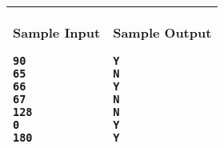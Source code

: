 \begin{table}[!h]
\centering
\begin{tabular}{|l|l|}
\hline
\begin{minipage}[t]{3in}
\textbf{Sample Input}
\begin{verbatim}
90
65
66
67
128
0
180
\end{verbatim}
\vspace{1mm}
\end{minipage}
&

\begin{minipage}[t]{3in}
\textbf{Sample Output}
\begin{verbatim}
Y
N
Y
N
N
Y
Y
\end{verbatim}
\vspace{1mm}
\end{minipage} \\
\hline
\end{tabular}
\end{table}

\newpage

